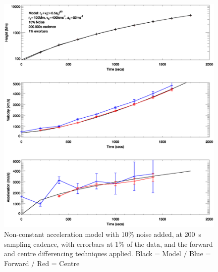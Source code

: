 \documentclass[namedreferences]{SolarPhysics}
\begin{document}
\begin{article}
\begin{figure}
 \centerline{\includegraphics[width=\linewidth]{images/nonconst_a_errorbars001_noise010_cadence200.ps}}
   \caption{Non-constant acceleration model with 10\% noise added, at 200~s sampling cadence, with errorbars at 1\% of the data, and the forward and centre differencing techniques applied. Black = Model / Blue = Forward / Red = Centre}
    \label{nonconst_a_errorbars001_noise010_cadence200}
\end{figure}


\end{article}
\end{document}
